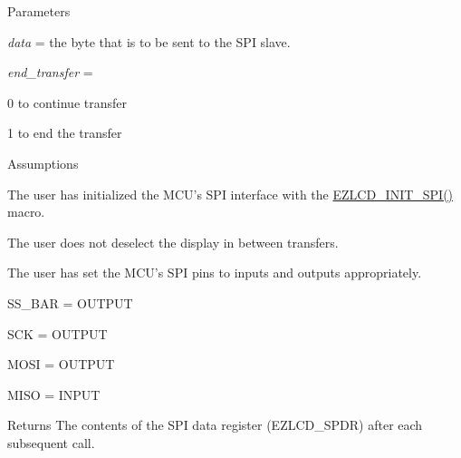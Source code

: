 \begin{DoxyParagraph}{Parameters}

\begin{DoxyItemize}
\item {\itshape data} = the byte that is to be sent to the S\-P\-I slave.
\item {\itshape end\-\_\-transfer} =
\begin{DoxyItemize}
\item 0 to continue transfer
\item 1 to end the transfer
\end{DoxyItemize}
\end{DoxyItemize}
\end{DoxyParagraph}
\begin{DoxyParagraph}{Assumptions}

\begin{DoxyItemize}
\item The user has initialized the M\-C\-U's S\-P\-I interface with the \hyperlink{group__ez_l_c_d__103__common_gaf5c3b2dedc950d34e0381946fbb32428}{E\-Z\-L\-C\-D\-\_\-\-I\-N\-I\-T\-\_\-\-S\-P\-I()} macro.
\item The user does not deselect the display in between transfers.
\item The user has set the M\-C\-U's S\-P\-I pins to inputs and outputs appropriately. \par
\par

\begin{DoxyItemize}
\item S\-S\-\_\-\-B\-A\-R = O\-U\-T\-P\-U\-T
\item S\-C\-K = O\-U\-T\-P\-U\-T
\item M\-O\-S\-I = O\-U\-T\-P\-U\-T
\item M\-I\-S\-O = I\-N\-P\-U\-T
\end{DoxyItemize}
\end{DoxyItemize}
\end{DoxyParagraph}
\begin{DoxyReturn}{Returns}
The contents of the S\-P\-I data register (E\-Z\-L\-C\-D\-\_\-\-S\-P\-D\-R) after each subsequent call. 
\end{DoxyReturn}
